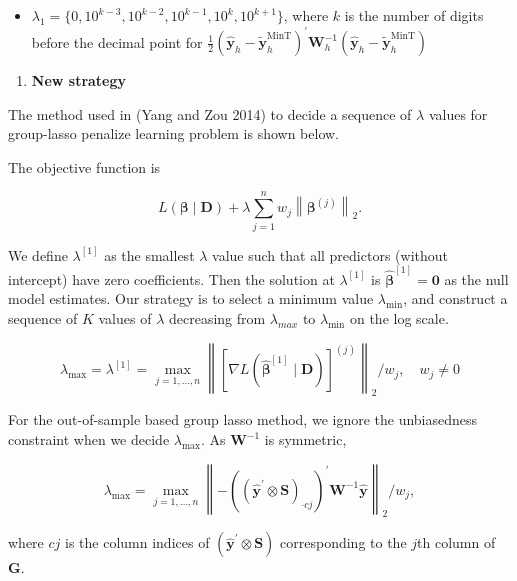 \documentclass[
  letterpaper,
  DIV=11,
  numbers=noendperiod]{scrartcl}
\providecommand{\tightlist}{%
  \setlength{\itemsep}{0pt}\setlength{\parskip}{0pt}}\usepackage{longtable,booktabs,array}
\begin{document}
\begin{itemize}
\tightlist
\item
  \(\lambda_1 = \{0, 10^{k-3}, 10^{k-2}, 10^{k-1}, 10^{k}, 10^{k+1}\}\),
  where \(k\) is the number of digits before the decimal point for
  \(\frac{1}{2}\left(\hat{\boldsymbol{y}}_h-\tilde{\boldsymbol{y}}_h^{\text{MinT}}\right)^{\prime} \boldsymbol{W}_h^{-1}\left(\hat{\boldsymbol{y}}_h-\tilde{\boldsymbol{y}}_h^{\text{MinT}}\right)\)
\end{itemize}

\begin{enumerate}
\def\labelenumi{\arabic{enumi}.}
\setcounter{enumi}{1}
\tightlist
\item
  \textbf{New strategy}
\end{enumerate}

The method used in (Yang and Zou 2014) to decide a sequence of
\(\lambda\) values for group-lasso penalize learning problem is shown
below.

The objective function is

\[
L(\boldsymbol{\beta} \mid \mathbf{D})+\lambda \sum_{j=1}^n w_j\left\|\boldsymbol{\beta}^{(j)}\right\|_2.
\]

We define \(\lambda^{[1]}\) as the smallest \(\lambda\) value such that
all predictors (without intercept) have zero coefficients. Then the
solution at \(\lambda^{[1]}\) is
\(\widehat{\boldsymbol{\beta}}^{[1]} = \boldsymbol{0}\) as the null
model estimates. Our strategy is to select a minimum value
\(\lambda_{\min}\), and construct a sequence of \(K\) values of
\(\lambda\) decreasing from \(\lambda_{max}\) to \(\lambda_{\min}\) on
the log scale.

\[
\lambda_{\max}=\lambda^{[1]}=\max _{j=1, \ldots, n}\left\|\left[\nabla L\left(\widehat{\boldsymbol{\beta}}^{[1]} \mid \mathbf{D}\right)\right]^{(j)}\right\|_2 / w_j, \quad w_j \neq 0
\]

For the out-of-sample based group lasso method, we ignore the
unbiasedness constraint when we decide \(\lambda_{\max}\). As
\(\boldsymbol{W}^{-1}\) is symmetric,

\[
\lambda_{\max}=\max _{j=1, \ldots, n}\left\|-\left(\left(\hat{\boldsymbol{y}}^{\prime} \otimes \boldsymbol{S}\right)_{\cdot cj}\right)^{\prime} \boldsymbol{W}^{-1} \hat{\boldsymbol{y}}\right\|_2 / w_j,
\]

where \(cj\) is the column indices of
\(\left(\hat{\boldsymbol{y}}^{\prime} \otimes \boldsymbol{S}\right)\)
corresponding to the \(j\)th column of \(\boldsymbol{G}\).
\end{document}
